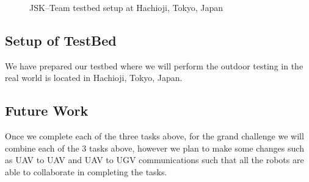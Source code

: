 \documentclass{standalone}
\begin{document}
\begin{figure*}[!b]
   \newcommand \ilenght{0.1}
   \newcommand \iheight{2.0in}
   \newcommand \iwidth{0.23\textwidth}
   \centering
   
   \hspace{1.1em}%
   \hspace{1.1em}%
   \hspace{1.1em}%
   \hspace{1.1em}%
   \caption{JSK--Team testbed setup at Hachioji, Tokyo, Japan}
   \label{fig:objects}
 \end{figure*}


\subsection{Setup of TestBed}

We have prepared our testbed where we will perform the outdoor testing in the real world is located in Hachioji, Tokyo, Japan. 

 \subsection{Future Work}
 Once we complete each of the three tasks above, for the grand challenge we will combine each of the 3 tasks above, however we plan to make some changes such as UAV to UAV and UAV to UGV communications such that all the robots are able to collaborate in completing the tasks.
 
\end{document}
